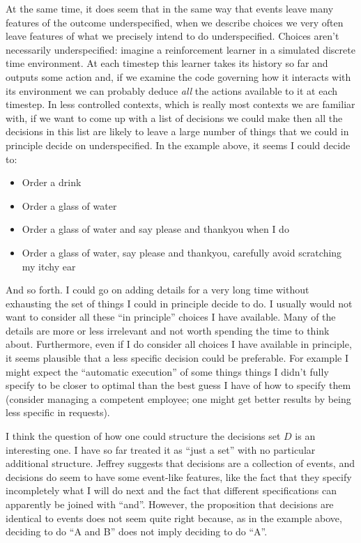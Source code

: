 At the same time, it does seem that in the same way that events leave many features of the outcome underspecified, when we describe choices we very often leave features of what we precisely intend to do underspecified. Choices aren't necessarily underspecified: imagine a reinforcement learner in a simulated discrete time environment. At each timestep this learner takes its history so far and outputs some action and, if we examine the code governing how it interacts with its environment we can probably deduce \emph{all} the actions available to it at each timestep. In less controlled contexts, which is really most contexts we are familiar with, if we want to come up with a list of decisions we could make then all the decisions in this list are likely to leave a large number of things that we could in principle decide on underspecified. In the example above, it seems I could decide to:
\begin{itemize}
    \item Order a drink
    \item Order a glass of water
    \item Order a glass of water and say please and thankyou when I do
    \item Order a glass of water, say please and thankyou, carefully avoid scratching my itchy ear
\end{itemize}

And so forth. I could go on adding details for a very long time without exhausting the set of things I could in principle decide to do. I usually would not want to consider all these ``in principle'' choices I have available. Many of the details are more or less irrelevant and not worth spending the time to think about. Furthermore, even if I do consider all choices I have available in principle, it seems plausible that a less specific decision could be preferable. For example I might expect the ``automatic execution'' of some things things I didn't fully specify to be closer to optimal than the best guess I have of how to specify them (consider managing a competent employee; one might get better results by being less specific in requests).

I think the question of how one could structure the decisions set $D$ is an interesting one. I have so far treated it as ``just a set'' with no particular additional structure. Jeffrey suggests that decisions are a collection of events, and decisions do seem to have some event-like features, like the fact that they specify incompletely what I will do next and the fact that different specifications can apparently be joined with ``and''. However, the proposition that decisions are identical to events does not seem quite right because, as in the example above, deciding to do ``A and B'' does not imply deciding to do ``A''.

